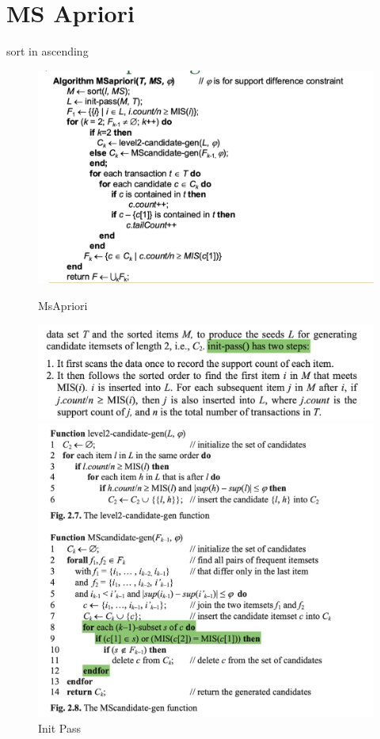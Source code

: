 \documentclass[10pt,oneside,a4paper]{article}
\begin{document}
\section{MS Apriori}
sort in ascending
\begin{figure}[H]
    \centering
    \begin{minipage}[t]{0.32\textwidth}
        \centering
        \includegraphics[width=\textwidth]{Images/MsApriori.png}
        \caption{MsApriori}
    \end{minipage}%
    \hfill
    \begin{minipage}[t]{0.32\textwidth}
        \centering
        \includegraphics[width=\textwidth]{Images/init_pass.png}
        \caption{Init Pass}
    \end{minipage}%
    \hfill
    \begin{minipage}[t]{0.32\textwidth}
        \centering
        \includegraphics[width=\textwidth]{Images/Candidate_gen_MS.png}

\end{minipage}
\end{figure}
\end{document}
